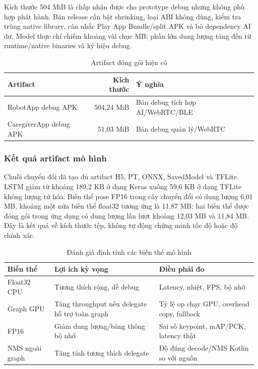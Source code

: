 Kích thước 504 MiB là chấp nhận được cho prototype debug nhưng không phù hợp phát hành. Bản release cần bật shrinking, loại ABI không dùng, kiểm tra trùng native library, cân nhắc Play App Bundle/split APK và bỏ dependency AI dư. Model thực chỉ chiếm khoảng vài chục MB; phần lớn dung lượng tăng đến từ runtime/native binaries và ký hiệu debug.

\begin{table}[htbp]
\centering
\caption{Artifact đóng gói hiện có}
\label{tab:apk_results}
\begin{tabular}{|l|r|l|}
\hline
\textbf{Artifact} & \textbf{Kích thước} & \textbf{Ý nghĩa} \\
\hline
RobotApp debug APK & 504,24 MiB & Bản debug tích hợp AI/WebRTC/BLE \\
\hline
CaregiverApp debug APK & 51,03 MiB & Bản debug quản lý/WebRTC \\
\hline
\end{tabular}
\end{table}

\subsubsection{Kết quả artifact mô hình}

Chuỗi chuyển đổi đã tạo đủ artifact H5, PT, ONNX, SavedModel và TFLite. LSTM giảm từ khoảng 189,2 KB ở dạng Keras xuống 59,6 KB ở dạng TFLite không lượng tử hóa. Biến thể pose FP16 trong cây chuyển đổi có dung lượng 6,01 MB, khoảng một nửa biến thể float32 tương ứng là 11,87 MB; hai biến thể được đóng gói trong ứng dụng có dung lượng lần lượt khoảng 12,03 MB và 11,84 MB. Đây là kết quả về kích thước tệp, không tự động chứng minh tốc độ hoặc độ chính xác.

\begin{table}[htbp]
\centering
\caption{Đánh giá định tính các biến thể mô hình}
\label{tab:model_variant_discussion}
\small
\begin{tabularx}{\textwidth}{|p{3.2cm}|p{3.3cm}|X|}
\hline
\textbf{Biến thể} & \textbf{Lợi ích kỳ vọng} & \textbf{Điều phải đo} \\
\hline
Float32 CPU & Tương thích rộng, dễ debug & Latency, nhiệt, FPS, bộ nhớ \\
\hline
Graph GPU & Tăng throughput nếu delegate hỗ trợ toàn graph & Tỷ lệ op chạy GPU, overhead copy, fallback \\
\hline
FP16 & Giảm dung lượng/băng thông bộ nhớ & Sai số keypoint, mAP/PCK, latency thật \\
\hline
NMS ngoài graph & Tăng tính tương thích delegate & Độ đúng decode/NMS Kotlin so với nguồn \\
\hline
\end{tabularx}
\end{table}

